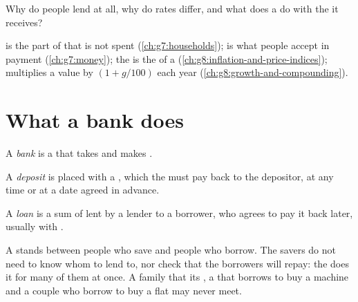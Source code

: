 Why do people lend at all, why do rates differ, and what does a  do with the  it receives?

\begin{recall}
 is the part of  that is not spent (\cref{ch:g7:households});  is what people
accept in payment (\cref{ch:g7:money}); the  is the  of a 
(\cref{ch:g8:inflation-and-price-indices});  multiplies a value by $(1 + g/100)$ each
year (\cref{ch:g8:growth-and-compounding}).
\end{recall}

\section{What a bank does}

\begin{definition}[Bank]\label{def:g8:banks-saving-interest:bank}
A \emph{bank} is a  that takes  and makes .
\end{definition}

\begin{definition}[Deposit]\label{def:g8:banks-saving-interest:deposit}
A \emph{deposit} is  placed with a , which the  must pay back to the
depositor, at any time or at a date agreed in advance.
\end{definition}

\begin{definition}[Loan]\label{def:g8:banks-saving-interest:loan}
A \emph{loan} is a sum of  lent by a lender to a borrower, who agrees to pay it back
later, usually with .
\end{definition}

A  stands between people who save and people who borrow. The savers do not need to know whom to
lend to, nor check that the borrowers will repay: the  does it for many of them at once. A family
that  its , a  that borrows to buy a machine and a couple who borrow to buy a flat
may never meet.

